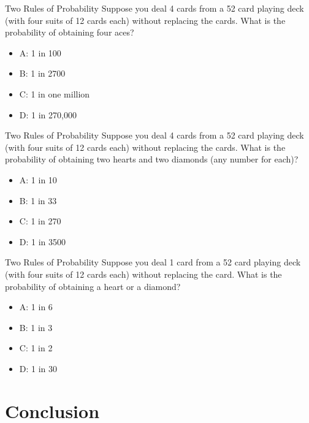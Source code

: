 \documentclass{beamer}
\begin{document}
\begin{frame}{Two Rules of Probability}
Suppose you deal 4 cards from a 52 card playing deck (with four suits of 12 cards each) without replacing the cards.  What is the probability of obtaining four aces?
\begin{itemize}
\item A: 1 in 100
\item B: 1 in 2700
\item C: 1 in one million
\item D: 1 in 270,000
\end{itemize}
\end{frame}

\begin{frame}{Two Rules of Probability}
Suppose you deal 4 cards from a 52 card playing deck (with four suits of 12 cards each) without replacing the cards.  What is the probability of obtaining two hearts and two diamonds (any number for each)?
\begin{itemize}
\item A: 1 in 10
\item B: 1 in 33
\item C: 1 in 270
\item D: 1 in 3500
\end{itemize}
\end{frame}

\begin{frame}{Two Rules of Probability}
Suppose you deal 1 card from a 52 card playing deck (with four suits of 12 cards each) without replacing the card.  What is the probability of obtaining a heart or a diamond?
\begin{itemize}
\item A: 1 in 6
\item B: 1 in 3
\item C: 1 in 2
\item D: 1 in 30
\end{itemize}
\end{frame}

\section{Conclusion}
\end{document}
